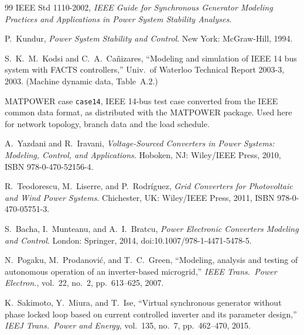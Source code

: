 \documentclass[12pt,a4paper]{article}
\theoremstyle{remark}
\begin{document}
\begin{thebibliography}{99}
 IEEE Std 1110-2002, \emph{IEEE Guide for Synchronous Generator
Modeling Practices and Applications in Power System Stability Analyses}.

 P.~Kundur, \emph{Power System Stability and Control}. New
York: McGraw-Hill, 1994.

 S.~K.~M.~Kodsi and C.~A.~Ca\~{n}izares, ``Modeling and
simulation of IEEE 14 bus system with FACTS controllers,'' Univ.\ of Waterloo
Technical Report 2003-3, 2003. (Machine dynamic data, Table~A.2.)

 MATPOWER case \texttt{case14}, IEEE 14-bus test case converted
from the IEEE common data format, as distributed with the MATPOWER package. Used
here for network topology, branch data and the load schedule.

 A.~Yazdani and R.~Iravani, \emph{Voltage-Sourced Converters
in Power Systems: Modeling, Control, and Applications}. Hoboken, NJ: Wiley/IEEE
Press, 2010, ISBN 978-0-470-52156-4.

 R.~Teodorescu, M.~Liserre, and P.~Rodr\'{i}guez,
\emph{Grid Converters for Photovoltaic and Wind Power Systems}. Chichester, UK:
Wiley/IEEE Press, 2011, ISBN 978-0-470-05751-3.

 S.~Bacha, I.~Munteanu, and A.~I.~Bratcu, \emph{Power
Electronic Converters Modeling and Control}. London: Springer, 2014,
doi:10.1007/978-1-4471-5478-5.

 N.~Pogaku, M.~Prodanovi\'{c}, and T.~C.~Green, ``Modeling,
analysis and testing of autonomous operation of an inverter-based microgrid,''
\emph{IEEE Trans.\ Power Electron.}, vol.~22, no.~2, pp.~613--625, 2007.

 K.~Sakimoto, Y.~Miura, and T.~Ise, ``Virtual synchronous
generator without phase locked loop based on current controlled inverter and its
parameter design,'' \emph{IEEJ Trans.\ Power and Energy}, vol.~135, no.~7,
pp.~462--470, 2015.


\end{thebibliography}
\end{document}
